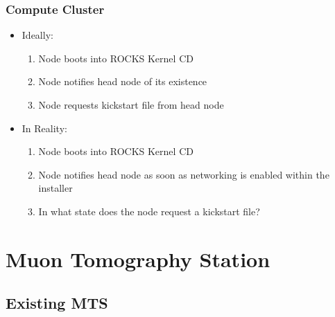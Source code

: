 \documentclass[aspectratio=169]{beamer}
\begin{document}
\begin{frame}

  \frametitle{Compute Cluster}

  \begin{multicols}{2}
    
    \begin{itemize}
      
    \item Ideally:
      \begin{enumerate}
      \item Node boots into ROCKS Kernel CD
      \item Node notifies head node of its existence
      \item Node requests kickstart file from head node
      \end{enumerate}
      
      \columnbreak
      
    \item In Reality:
      \begin{enumerate}
      \item Node boots into ROCKS Kernel CD
      \item Node notifies head node as soon as networking is enabled within
        the installer
      \item In what state does the node request a kickstart file?
      \end{enumerate}
      
    \end{itemize}
    
  \end{multicols}


\end{frame}


\section{Muon Tomography Station}


\subsection{Existing MTS}
\end{document}
